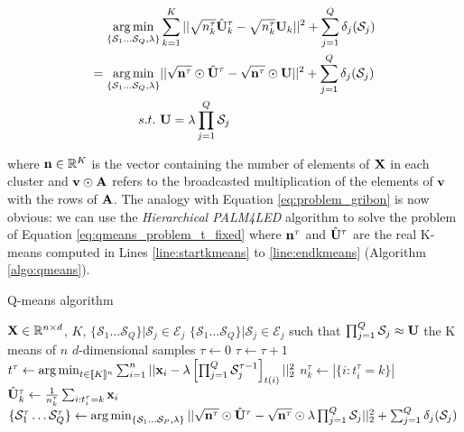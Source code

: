 \documentclass{article}
\begin{document}
\begin{equation}
\label{eq:qmeans_problem_t_fixed}
\begin{split}
 \operatorname*{arg\,min}_{\{\mathcal{S}_1 \dots \mathcal{S}_Q, \lambda\}} & \sum_{k=1}^{K} ||\sqrt{n_k^\tau}\hat{{\mathbf{U}}}^{\tau}_k - \sqrt{n_k^\tau}{\mathbf{U}}_k||^2 + \sum_{j=1}^{Q} \delta_j(\mathcal{S}_j)\\
 =\operatorname*{arg\,min}_{\{\mathcal{S}_1 \dots \mathcal{S}_Q, \lambda\}} & ||\sqrt{{\mathbf{n}}^\tau} \odot \hat{{\mathbf{U}}}^{\tau} - \sqrt{{\mathbf{n}}^\tau} \odot {\mathbf{U}}||^2 + \sum_{j=1}^{Q} \delta_j(\mathcal{S}_j)\\
 s.t. ~& {\mathbf{U}} = \lambda \prod_{j=1}^{Q}{\mathcal{S}_j} \\
\end{split}
\end{equation}

where ${\mathbf{n}} \in \mathbb{R}^K$ is the vector containing the number of elements of ${\mathbf{X}}$ in each cluster and ${\mathbf{v}} \odot {\mathbf{A}}$ refers to the broadcasted multiplication of the elements of ${\mathbf{v}}$ with the rows of ${\mathbf{A}}$. The analogy with Equation \ref{eq:problem_gribon} is now obvious: we can use the \textit{Hierarchical PALM4LED} algorithm \cite{magoarou2014learning} to solve the problem of Equation \ref{eq:qmeans_problem_t_fixed} where ${\mathbf{n}}^\tau$ and $\hat{{\mathbf{U}}}^{\tau}$ are the real K-means computed in Lines \ref{line:startkmeans} to \ref{line:endkmeans} (Algorithm \ref{algo:qmeans}).

\begin{algorithm}
\caption{Q-means algorithm}
\label{algo:qmeans}
\begin{algorithmic}[1]


\REQUIRE ${\mathbf{X}} \in \mathbb{R}^{n \times d}$, $K$, $\{\mathcal{S}_1 \dots \mathcal{S}_{Q}\}|\mathcal{S}_j \in \mathcal{E}_j$
\ENSURE $\{\mathcal{S}_1 \dots \mathcal{S}_{Q}\}|\mathcal{S}_j \in \mathcal{E}_j$ such that $\prod_{j=1}^{Q}\mathcal{S}_j \approx {\mathbf{U}}$ the K means of $n$ $d$-dimensional samples
\STATE $\tau \leftarrow 0$
\REPEAT
\STATE $\tau \leftarrow \tau + 1$
\STATE $t^\tau \leftarrow \operatorname*{arg\,min}_{t \in [\![K]\!]^n} \sum_{i=1}^{n} {||{\mathbf{x}}_i - \lambda \left[\prod_{j=1}^{Q}{\mathcal{S}_j^{\tau -1}}\right]_{t(i)}||_2^2}$
\label{line:startkmeans}
\STATE $n_k^\tau \leftarrow |\{i: t^\tau_i=k\}|$
\STATE $\hat{{\mathbf{U}}}^\tau_k \leftarrow \frac{1}{n^\tau_k} \sum_{i: t^\tau_i = k} {{\mathbf{x}}_i}$
\ENDFOR
\label{line:endkmeans}
\STATE $\{\mathcal{S}^\tau_1 \dots \mathcal{S}^\tau_{Q}\} \leftarrow \operatorname*{arg\,min}_{\{\mathcal{S}_1 \dots \mathcal{S}_P, \lambda\}} ||\sqrt{{\mathbf{n}}^\tau} \odot \hat{{\mathbf{U}}}^\tau - \sqrt{{\mathbf{n}}^\tau} \odot \lambda \prod_{j=1}^{Q}{\mathcal{S}_j}||_2^2 + \sum_{j=1}^{Q} \delta_j(\mathcal{S}_j)$
\end{algorithmic}
\end{algorithm}
\end{document}
